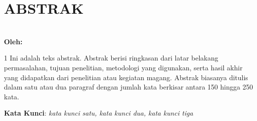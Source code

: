 \chapter*{ABSTRAK}

\begin{center}
    \textbf{\MakeUppercase{\Judul}}\\[0.5cm]
    \textbf{Oleh: \Nama}
\end{center}

\vspace{0.5cm}

\begin{spacing}{1}
Ini adalah teks abstrak. Abstrak berisi ringkasan dari latar belakang permasalahan, tujuan penelitian, metodologi yang digunakan, serta hasil akhir yang didapatkan dari penelitian atau kegiatan magang. Abstrak biasanya ditulis dalam satu atau dua paragraf dengan jumlah kata berkisar antara 150 hingga 250 kata.

\vspace{0.5cm}
\noindent
\textbf{Kata Kunci}: \textit{kata kunci satu, kata kunci dua, kata kunci tiga}
\end{spacing}
